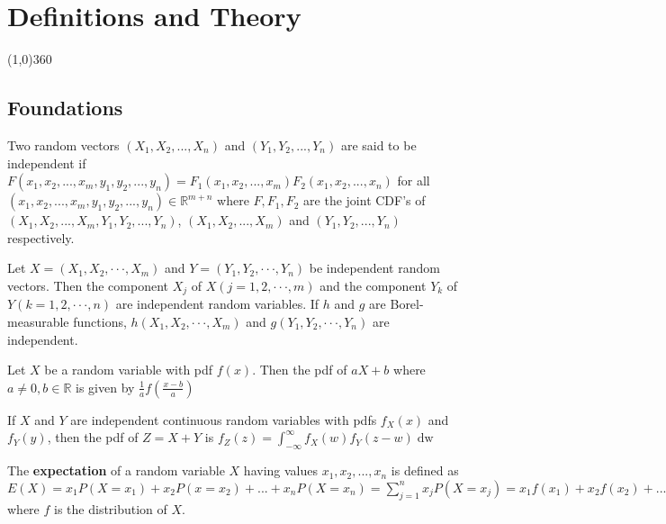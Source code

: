 \chapter{Definitions and Theory}
\line(1,0){360} \\

\section{Foundations}

\begin{defn}
    Two random vectors $(X_1, X_2, ..., X_n)$ and $(Y_1, Y_2, ..., Y_n)$ are said to be independent if $F(x_1, x_2, ..., x_m, y_1, y_2, ..., y_n) = F_1 (x_1, x_2, ..., x_m) F_2 (x_1, x_2, ..., x_n)$ for all $(x_1, x_2, ..., x_m, y_1, y_2, ..., y_n) \in \mathbb{R}^{m+n}$ where $F, F_1, F_2$ are the joint CDF's of $(X_1, X_2, ..., X_m, Y_1, Y_2, ..., Y_n)$, $(X_1, X_2, ..., X_m)$ and $(Y_1, Y_2, ..., Y_n)$ respectively.
\end{defn}

\begin{thm}
    Let $X = (X_1, X_2, · · · , X_m)$ and $Y = (Y_1, Y_2, · · · , Y_n)$ be independent random vectors. Then the component $X_j$ of $X(j = 1, 2, · · · , m)$ and the component $Y_k$ of $Y(k = 1, 2, · · · , n)$ are independent random variables. If $h$ and $g$ are Borel-measurable functions, $h(X_1, X_2, · · · , X_m)$ and $g(Y_1, Y_2, · · · , Y_n)$ are independent.
\end{thm}

\begin{thm}
    Let $X$ be a random variable with pdf $f(x)$. Then the pdf of $aX+b$ where $a \neq 0, b \in \mathbb{R}$ is given by $\displaystyle \frac{1}{a} f \left (\frac{x-b}{a} \right)$
\end{thm}

\begin{thm}
    If $X$ and $Y$ are independent continuous random variables with pdfs $f_X(x)$ and $f_Y(y)$, then the pdf of $Z = X+Y$ is $f_Z\left (z\right ) = \displaystyle\int_{- \infty}^\infty f_X \left (w\right ) f_Y \left (z - w\right ) \mathop{\mathrm{d} w}$
\end{thm}

\begin{defn}
    The \textbf{expectation} of a random variable $X$ having values $x_1, x_2, ..., x_n$ is defined as $E\left (X\right ) = x_1  P\left (X = x_1\right ) + x_2 P\left (x = x_2\right ) + ... + x_n P\left (X = x_n\right ) =  \sum_{j = 1}^n x_j P\left (X = x_j\right ) = x_1 f\left (x_1\right ) + x_2 f\left (x_2\right ) + ... + x_n f\left (x_n\right ) = \sum_{j=1} \to n x_j f\left (x_j\right )$ where $f$ is the distribution of $X$.
\end{defn}


